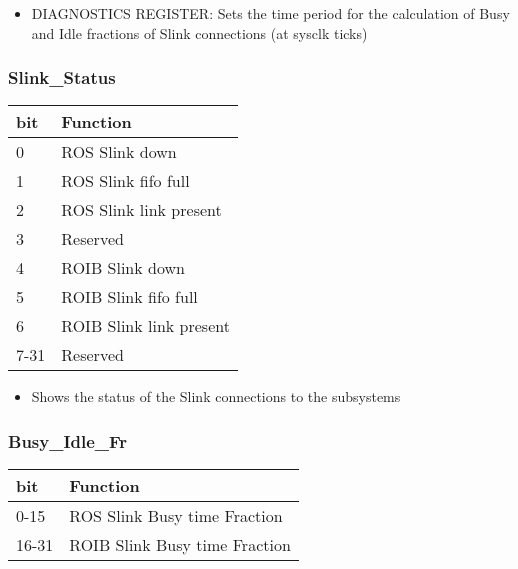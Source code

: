 \begin{itemize}
\item DIAGNOSTICS REGISTER: Sets the time period for the calculation of Busy and Idle fractions of Slink connections (at sysclk ticks)
\end{itemize}



\subsubsection{Slink\_Status}

\begin {table}[H]
\begin{center}
\begin{tabular}{|l|l|}
\hline
\textbf{bit} & \textbf{Function} \\
\hline
0 & ROS Slink down \\
\hline
1 & ROS Slink fifo full \\
\hline
2 & ROS Slink link present \\
\hline
3 & Reserved \\
\hline
4 & ROIB Slink down \\
\hline
5 & ROIB Slink fifo full \\
\hline
6 & ROIB Slink link present \\
\hline
7-31 & Reserved \\
\hline
\end{tabular}
\end{center}
\end{table}


\begin{itemize}
\item Shows the status of the Slink connections to the subsystems
\end{itemize}




\subsubsection{Busy\_Idle\_Fr}

\begin {table}[H]
\begin{center}
\begin{tabular}{|l|l|}
\hline
\textbf{bit} & \textbf{Function} \\
\hline
0-15 & ROS Slink Busy time Fraction \\
\hline
16-31 & ROIB Slink Busy time Fraction \\
\hline
\end{tabular}
\end{center}
\end{table}


